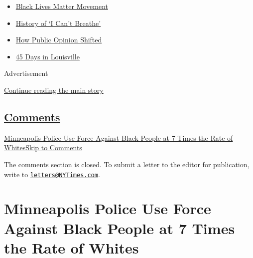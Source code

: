 \begin{itemize}
\tightlist
\item
  \href{https://www.nytimes3xbfgragh.onion/interactive/2020/07/03/us/george-floyd-protests-crowd-size.html?name=styln-george-floyd\&region=TOP_BANNER\&variant=undefined\&block=storyline_menu_recirc\&action=click\&pgtype=Interactive\&impression_id=48634700-e3ab-11ea-adff-4dc7383067ec}{Black
  Lives Matter Movement}
\item
  \href{https://www.nytimes3xbfgragh.onion/interactive/2020/06/28/us/i-cant-breathe-police-arrest.html?name=styln-george-floyd\&region=TOP_BANNER\&variant=undefined\&block=storyline_menu_recirc\&action=click\&pgtype=Interactive\&impression_id=48634701-e3ab-11ea-adff-4dc7383067ec}{History
  of `I Can't Breathe'}
\item
  \href{https://www.nytimes3xbfgragh.onion/interactive/2020/06/10/upshot/black-lives-matter-attitudes.html?name=styln-george-floyd\&region=TOP_BANNER\&variant=undefined\&block=storyline_menu_recirc\&action=click\&pgtype=Interactive\&impression_id=48634702-e3ab-11ea-adff-4dc7383067ec}{How
  Public Opinion Shifted}
\item
  \href{https://www.nytimes3xbfgragh.onion/interactive/2020/07/16/us/black-lives-matter-protests-louisville-breonna-taylor.html?name=styln-george-floyd\&region=TOP_BANNER\&variant=undefined\&block=storyline_menu_recirc\&action=click\&pgtype=Interactive\&impression_id=48636e10-e3ab-11ea-adff-4dc7383067ec}{45
  Days in Louisville}
\end{itemize}

Advertisement

\protect\hyperlink{after-top}{Continue reading the main story}

\hypertarget{comments}{%
\subsection{\texorpdfstring{\protect\hyperlink{commentsContainer}{Comments}}{Comments}}\label{comments}}

\href{}{Minneapolis Police Use Force Against Black People at 7 Times the
Rate of Whites}\href{}{Skip to Comments}

The comments section is closed. To submit a letter to the editor for
publication, write to
\href{mailto:letters@NYTimes.com}{\nolinkurl{letters@NYTimes.com}}.

\hypertarget{minneapolis-police-use-force-against-black-people-at-7-times-the-rate-of-whites}{%
\section{Minneapolis Police Use Force Against Black People at 7 Times
the Rate of
Whites}\label{minneapolis-police-use-force-against-black-people-at-7-times-the-rate-of-whites}}

